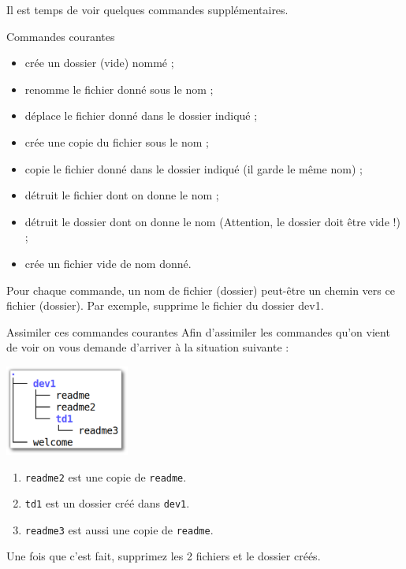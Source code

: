 \documentclass[a4paper,11pt]{style-esi/td}
\begin{document}
		\bigskip
		Il est temps de voir quelques commandes supplémentaires.

		\begin{theorie}{Commandes courantes}
			\begin{itemize}
			\item {}
				crée un dossier (vide) nommé  ;
			\item {} 
				renomme le fichier donné  sous le nom  ;
			\item {}
				déplace le fichier donné dans le dossier indiqué ;
			\item {} 
				crée une copie du fichier sous le nom  ;
			\item {} copie le fichier donné dans le dossier indiqué 
				(il garde le même nom) ;
			\item {} détruit le fichier dont on donne le nom ;
			\item {} détruit le dossier dont on donne le nom 
				(Attention, le dossier doit être vide !) ;
			\item {} crée un fichier vide de nom donné.
			\end{itemize}
		\end{theorie}

		Pour chaque commande, un nom de fichier (dossier)
		peut-être un chemin vers ce fichier (dossier).
		Par exemple,  
		supprime le fichier  du dossier {dev1}.

		\begin{Exercice}{Assimiler ces commandes courantes}
			Afin d'assimiler les commandes qu'on vient de voir 
			on vous demande d'arriver à la situation suivante :
			\begin{center}
				\includegraphics[height=8em]{images/ex-cmd-courtantes.pdf}
			\end{center}
			\begin{enumerate}
			\item \verb|readme2| est une copie de \verb|readme|.
			\item \verb|td1| est un dossier créé dans \verb|dev1|.
			\item \verb|readme3| est aussi une copie de \verb|readme|.
			\end{enumerate}
			Une fois que c'est fait, supprimez les 2 fichiers et le dossier créés.
		\end{Exercice}
\end{document}
